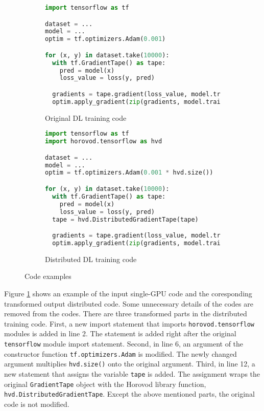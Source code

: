\begin{figure}[ht!]
  \centering
  \begin{subfigure}[t]{0.48\textwidth}
    \begin{lstlisting}[language=Python]
import tensorflow as tf

dataset = ...
model = ...
optim = tf.optimizers.Adam(0.001) 

for (x, y) in dataset.take(10000):
  with tf.GradientTape() as tape:
    pred = model(x)
    loss_value = loss(y, pred) 

  gradients = tape.gradient(loss_value, model.trainable_variables)
  optim.apply_gradient(zip(gradients, model.trainable_variable)\end{lstlisting}
    \caption{Original DL training code}
  \end{subfigure}
  \hspace{5mm}
  \begin{subfigure}[t]{0.48\textwidth}
    \begin{lstlisting}[language=Python]
import tensorflow as tf
import horovod.tensorflow as hvd

dataset = ...
model = ...
optim = tf.optimizers.Adam(0.001 * hvd.size()) 

for (x, y) in dataset.take(10000):
  with tf.GradientTape() as tape:
    pred = model(x)
    loss_value = loss(y, pred) 
  tape = hvd.DistributedGradientTape(tape)

  gradients = tape.gradient(loss_value, model.trainable_variables)
  optim.apply_gradient(zip(gradients, model.trainable_variable)\end{lstlisting}
    \caption{Distributed DL training code}
  \end{subfigure}
  \caption{Code examples}
  \label{fig:trans:ex}
\end{figure}

Figure \ref{fig:trans:ex} shows an example of the input single-GPU code and
the coresponding transformed output distributed code. 
Some unnecessary details of the codes are removed from the codes.
There are three transformed parts in the distributed training code.
First, a new import statement that imports {\tt horovod.tensorflow} modules
is added in line 2. 
The statement is added right after the original {\tt tensorflow} module
import statement.
Second, in line 6, an argument of the constructor function 
{\tt tf.optimizers.Adam} is modified. The newly changed argument multiplies
{\tt hvd.size()} onto the original argument.
Third, in line 12, a new statement that assigns the variable {\tt tape}
is added. The assignment wraps the original {\tt GradientTape} object with
the Horovod library function, {\tt hvd.DistributedGradientTape}.
Except the above mentioned parts, the original code is not modified.     

